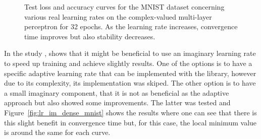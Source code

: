 \begin{figure}[htbp]
	\centering
	\caption{Test loss and accuracy curves for the MNIST dataset concerning various real learning rates on the complex-valued multi-layer perceptron for 32 epochs. As the learning rate increases, convergence time improves but also stability decreases.}
	\label{fig:lr_dense_mnist}
\end{figure}

In the study \parencite{zhang2015complex}, shows that it might be beneficial to use an imaginary learning rate to speed up training and achieve slightly results. One of the options is to have a specific adaptive learning rate that can be implemented with the library, however due to its complexity, its implementation was skiped. The other option is to have a small imaginary component, that it is not as beneficial as the adaptive approach but also showed some improvements. The latter was tested and Figure~\ref{fig:lr_im_dense_mnist} shows the results where one can see that there is this slight benefit in convergence time but, for this case, the local minimum value is around the same for each curve.

